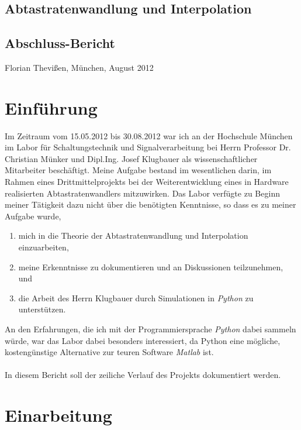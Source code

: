 \documentclass[11pt]{article}
\begin{document}


\setlength{\parindent}{0ex}

\begin{center}
\section*{Abtastratenwandlung und Interpolation}
\subsection*{Abschluss-Bericht}
Florian Thevißen, München, August 2012
\end{center}
\vspace{.5cm}

\section{Einführung}

Im Zeitraum vom 15.05.2012 bis 30.08.2012 war ich an der Hochschule München im Labor für Schaltungstechnik und Signalverarbeitung bei Herrn Professor Dr. Christian Münker und Dipl.Ing. Josef Klugbauer als wissenschaftlicher Mitarbeiter beschäftigt. Meine Aufgabe bestand im wesentlichen darin, im Rahmen eines Drittmittelprojekts bei der Weiterentwicklung eines in Hardware realisierten Abtastratenwandlers mitzuwirken. Das Labor verfügte zu Beginn meiner Tätigkeit dazu nicht über die benötigten Kenntnisse, so dass es zu meiner Aufgabe wurde,

\begin{enumerate}
	\item{mich in die Theorie der Abtastratenwandlung und Interpolation einzuarbeiten,}
	\item{meine Erkenntnisse zu dokumentieren und an Diskussionen teilzunehmen, und}
	\item{die Arbeit des Herrn Klugbauer durch Simulationen in \emph{Python} zu unterstützen.}
\end{enumerate}

An den Erfahrungen, die ich mit der Programmiersprache \emph{Python} dabei sammeln würde, war das Labor dabei besonders interessiert, da Python eine mögliche, kostengünstige Alternative zur teuren Software \emph{Matlab} ist.\\
\\
In diesem Bericht soll der zeiliche Verlauf des Projekts dokumentiert werden.

\section{Einarbeitung}
\end{document}
